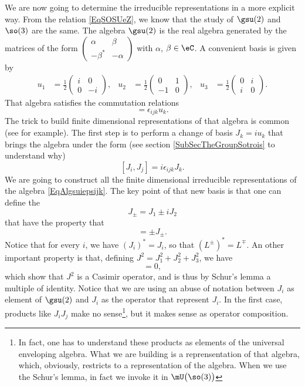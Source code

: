 We are now going to determine the irreducible representations in a more explicit way. From the relation \eqref{EqSOSUeZ}, we know that the study of $\gsu(2)$ and $\so(3)$ are the same. The algebra $\gsu(2)$ is the real algebra generated by the matrices of the form
$
\begin{pmatrix}
\alpha	&\beta\\
-\beta^*&-\alpha
\end{pmatrix}
$ with $\alpha$, $\beta\in\eC$. A convenient basis is given by
\begin{align}		\label{EqGenssudeux}
u_1&=\frac{ 1 }{2}
\begin{pmatrix}
  i	&	0	\\
  0	&	-i	
\end{pmatrix},
&u_2&=
\frac{ 1 }{2}
\begin{pmatrix}
  0	&	1	\\ 
  -1	&	0	
\end{pmatrix},
&u_3&=\frac{ 1 }{2}
\begin{pmatrix}
  0	&	i	\\ 
  i	&	0
\end{pmatrix}.
\end{align}
That algebra satisfies the commutation relations
\begin{equation}
	[u_i,u_j]=\epsilon_{ijk}u_k.
\end{equation}
The trick to build finite dimensional representations of that algebra is common (see \cite{MQSenechal} for example). The first step is to perform a change of basis $J_k=iu_k$ that brings the algebra under the form (see section \ref{SubSecTheGroupSotrois} to understand why)
\begin{equation}		\label{EqAlgsuiepsijk}
	[J_i,J_j]=i\epsilon_{ijk}J_k.
\end{equation}
We are going to construct all the finite dimensional irreducible representations of the algebra \eqref{EqAlgsuiepsijk}. The key point of that new basis is that one can define the 
\begin{equation}
	J_{\pm}=J_1\pm iJ_2
\end{equation}
that have the property that 
\begin{equation}
	[J_3,J_{\pm}]=\pm J_{\pm}.
\end{equation}
Notice that for every $i$, we have $(J_i)^*=J_i$, so that $(L^{\pm})^*=L^{\mp}$. An other important property is that, defining $J^2=J_1^2+J_2^2+J_3^2$, we have
\begin{equation}
	[J_i,J^2]=0,
\end{equation}
which show that $J^2$ is a Casimir operator, and is thus by Schur's lemma a multiple of identity. Notice that we are using an abuse of notation between $J_i$ as element of $\gsu(2)$ and $J_i$ as the operator that represent $J_i$. In the first case, products like $J_iJ_j$ make no sense\footnote{In fact, one has to understand these products as elements of the universal enveloping algebra. What we are building is a reprensentation of that algebra, which, obviously, restricts to a representation of the algebra. When we use the Schur's lemma, in fact we invoke it in $\mU\big(\so(3)\big)$}, but it makes sense as operator composition.

